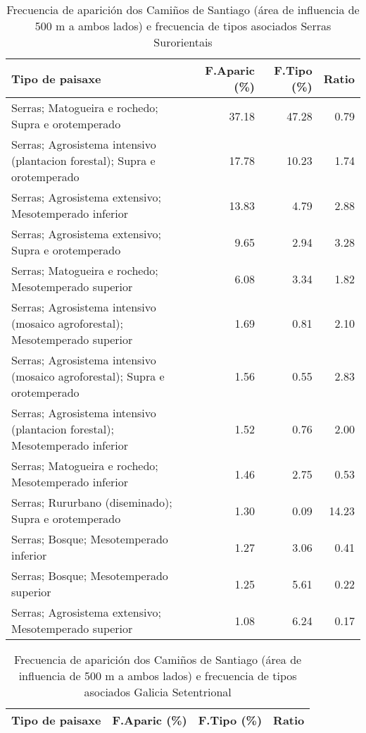 \begin{table}[p]
\centering
\caption{Frecuencia de aparición dos Camiños de Santiago (área de influencia de 500 m a ambos lados) e frecuencia de tipos asociados Serras Surorientais} 
\label{vcamino9}
\begin{tabular}{lrrr}
  \hline
Tipo de paisaxe & F.Aparic (\%) & F.Tipo (\%) & Ratio \\ 
  \hline
Serras; Matogueira e rochedo; Supra e orotemperado & 37.18 & 47.28 & 0.79 \\ 
  Serras; Agrosistema intensivo (plantacion forestal); Supra e orotemperado & 17.78 & 10.23 & 1.74 \\ 
  Serras; Agrosistema extensivo; Mesotemperado inferior & 13.83 & 4.79 & 2.88 \\ 
  Serras; Agrosistema extensivo; Supra e orotemperado & 9.65 & 2.94 & 3.28 \\ 
  Serras; Matogueira e rochedo; Mesotemperado superior & 6.08 & 3.34 & 1.82 \\ 
  Serras; Agrosistema intensivo (mosaico agroforestal); Mesotemperado superior & 1.69 & 0.81 & 2.10 \\ 
  Serras; Agrosistema intensivo (mosaico agroforestal); Supra e orotemperado & 1.56 & 0.55 & 2.83 \\ 
  Serras; Agrosistema intensivo (plantacion forestal); Mesotemperado inferior & 1.52 & 0.76 & 2.00 \\ 
  Serras; Matogueira e rochedo; Mesotemperado inferior & 1.46 & 2.75 & 0.53 \\ 
  Serras; Rururbano (diseminado); Supra e orotemperado & 1.30 & 0.09 & 14.23 \\ 
  Serras; Bosque; Mesotemperado inferior & 1.27 & 3.06 & 0.41 \\ 
  Serras; Bosque; Mesotemperado superior & 1.25 & 5.61 & 0.22 \\ 
  Serras; Agrosistema extensivo; Mesotemperado superior & 1.08 & 6.24 & 0.17 \\ 
   \hline
\end{tabular}
\end{table}
\begin{table}[p]
\centering
\caption{Frecuencia de aparición dos Camiños de Santiago (área de influencia de 500 m a ambos lados) e frecuencia de tipos asociados Galicia Setentrional} 
\label{vcamino10}
\begin{tabular}{lrrr}
  \hline
Tipo de paisaxe & F.Aparic (\%) & F.Tipo (\%) & Ratio \\ 
  \hline
\hline
\end{tabular}
\end{table}
